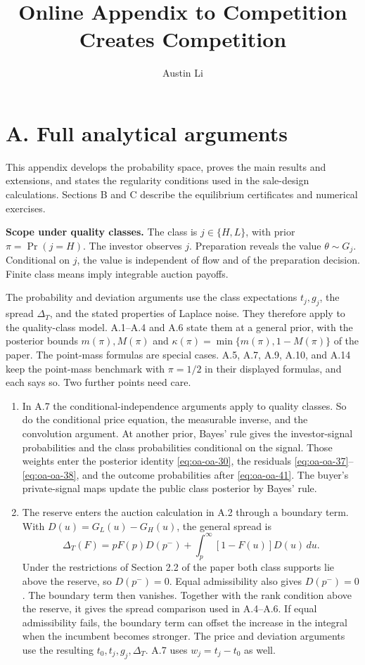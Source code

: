 \documentclass[
  11pt,
]{article}
\title{Online Appendix to Competition Creates Competition}
\author{Austin Li}
\date{}
\begin{document}
\maketitle

\section{A. Full analytical arguments}\label{oa-a}

This appendix develops the probability space, proves the main results
and extensions, and states the regularity conditions used in the
sale-design calculations. Sections B and C describe the equilibrium
certificates and numerical exercises.

\protect{}\label{oa-a-quality-class-scope}
\noindent\textbf{Scope under quality classes.}
The class is \(j\in\{H,L\}\), with prior \(\pi=\Pr(j=H)\).
The investor observes \(j\).
Preparation reveals the value \(\theta\sim G_j\).
Conditional on \(j\), the value is independent of flow and of the preparation decision.
Finite class means imply integrable auction payoffs.
\par
The probability and deviation arguments use the class expectations
\(t_j,g_j\), the spread \(\Delta_T\), and the stated properties of Laplace noise.
They therefore apply to the quality-class model.
A.1--A.4 and A.6 state them at a general prior, with the posterior bounds
\(m(\pi),M(\pi)\) and \(\kappa(\pi)=\min\{m(\pi),1-M(\pi)\}\) of the paper.
The point-mass formulas are special cases.
A.5, A.7, A.9, A.10, and A.14 keep the point-mass benchmark with \(\pi=1/2\) in their displayed formulas, and each says so.
Two further points need care.

\begin{enumerate}
\item
In A.7 the conditional-independence arguments apply to quality classes.
So do the conditional price equation, the measurable inverse, and the convolution argument.
At another prior, Bayes' rule gives the investor-signal probabilities and the class probabilities conditional on the signal.
Those weights enter the posterior identity \eqref{eq:oa-oa-30}, the residuals \eqref{eq:oa-oa-37}--\eqref{eq:oa-oa-38}, and the outcome probabilities after \eqref{eq:oa-oa-41}.
The buyer's private-signal maps update the public class posterior by Bayes' rule.

\item
The reserve enters the auction calculation in A.2 through a boundary term.
With \(D(u)=G_L(u)-G_H(u)\), the general spread is
\[
\Delta_T(F)=pF(p)D(p^-)+\int_p^\infty[1-F(u)]D(u)\,du.
\]
Under the restrictions of Section 2.2 of the paper both class supports lie above the reserve, so \(D(p^-)=0\).
Equal admissibility also gives \(D(p^-)=0\).
The boundary term then vanishes.
Together with the rank condition above the reserve, it gives the spread comparison used in A.4--A.6.
If equal admissibility fails, the boundary term can offset the increase in the integral when the incumbent becomes stronger.
The price and deviation arguments use the resulting \(t_0,t_j,g_j,\Delta_T\).
A.7 uses \(w_j=t_j-t_0\) as well.
\end{enumerate}
\end{document}
